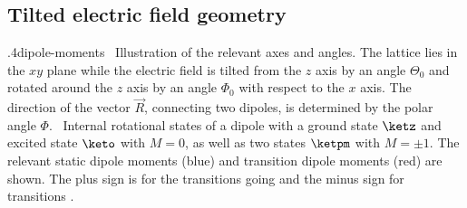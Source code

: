 \subsection{Tilted electric field geometry}
{.4}{dipole-moments}{ }
{\sfA~Illustration of the relevant axes and angles. The lattice lies in the $xy$ plane while the electric field is tilted from the $z$ axis by an angle $\Theta_0$ and rotated around the $z$ axis by an angle $\Phi_0$ with respect to the $x$ axis. The direction of the vector $\vec{R}$, connecting two dipoles, is determined by the polar angle $\Phi$.
\sfB~Internal rotational states of a dipole with a ground state $\ketz$ and excited state $\keto$ with $M=0$, as well as two states $\ketpm$ with $M=\pm 1$. The relevant static dipole moments (blue) and transition dipole moments (red) are shown. The plus sign is for the transitions going  and the minus sign for transitions .}


